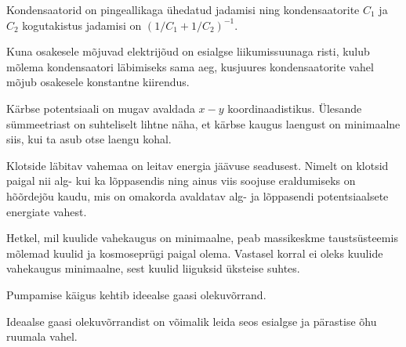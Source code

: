 \documentclass[10pt]{article}
\begin{document}
{
\hint
Kondensaatorid on pingeallikaga ühedatud jadamisi ning kondensaatorite $C_1$ ja $C_2$ kogutakistus jadamisi on $\left( 1/C_1 + 1/C_2 \right) ^{-1}$. 

Kuna osakesele mõjuvad elektrijõud on esialgse liikumissuunaga risti, kulub mõlema kondensaatori läbimiseks sama aeg, kusjuures kondensaatorite vahel mõjub osakesele konstantne kiirendus.
\probend
\bigskip


\hint
Kärbse potentsiaali on mugav avaldada $x-y$ koordinaadistikus. Ülesande sümmeetriast on suhteliselt lihtne näha, et kärbse kaugus laengust on minimaalne siis, kui ta asub otse laengu kohal.
\probend
\bigskip


\hint
Klotside läbitav vahemaa on leitav energia jäävuse seadusest. Nimelt on klotsid paigal nii alg- kui ka lõppasendis ning ainus viis soojuse eraldumiseks on hõõrdejõu kaudu, mis on omakorda avaldatav alg- ja lõppasendi potentsiaalsete energiate vahest.
\probend
\bigskip


\hint
Hetkel, mil kuulide vahekaugus on minimaalne, peab massikeskme taustsüsteemis mõlemad kuulid ja kosmoseprügi paigal olema. Vastasel korral ei oleks kuulide vahekaugus minimaalne, sest kuulid liiguksid üksteise suhtes.
\probend
\bigskip


\hint
Pumpamise käigus kehtib ideealse gaasi olekuvõrrand.
\probend
\bigskip


\hint
Ideaalse gaasi olekuvõrrandist on võimalik leida seos esialgse ja pärastise õhu ruumala vahel.
\probend
\bigskip


}
\end{document}
